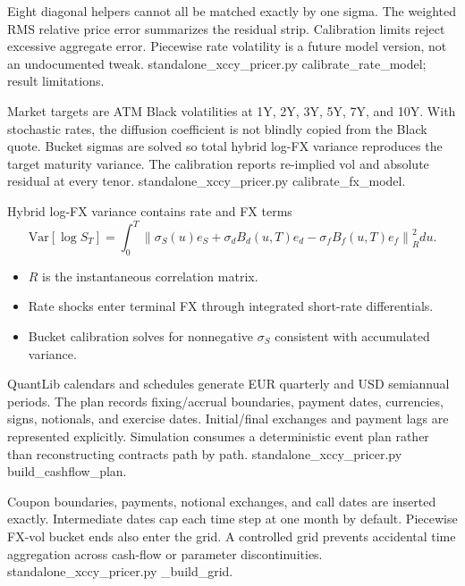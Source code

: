 {Eight diagonal helpers cannot all be matched exactly by one sigma.}
{The weighted RMS relative price error summarizes the residual strip.}
{Calibration limits reject excessive aggregate error.}
{Piecewise rate volatility is a future model version, not an undocumented tweak.}
{standalone\_xccy\_pricer.py calibrate\_rate\_model; result limitations.}

{Market targets are ATM Black volatilities at 1Y, 2Y, 3Y, 5Y, 7Y, and 10Y.}
{With stochastic rates, the diffusion coefficient is not blindly copied from the Black quote.}
{Bucket sigmas are solved so total hybrid log-FX variance reproduces the target maturity variance.}
{The calibration reports re-implied vol and absolute residual at every tenor.}
{standalone\_xccy\_pricer.py calibrate\_fx\_model.}

\begin{frame}{Hybrid log-FX variance contains rate and FX terms}
  \[
  \mathrm{Var}[\log S_T]
  =\int_0^T \left\|\sigma_S(u)e_S
  +\sigma_d B_d(u,T)e_d
  -\sigma_f B_f(u,T)e_f\right\|_R^2du.
  \]
  \begin{itemize}\setlength\itemsep{0.8em}
    \item $R$ is the instantaneous correlation matrix.
    \item Rate shocks enter terminal FX through integrated short-rate differentials.
    \item Bucket calibration solves for nonnegative $\sigma_S$ consistent with accumulated variance.
  \end{itemize}
\end{frame}

{QuantLib calendars and schedules generate EUR quarterly and USD semiannual periods.}
{The plan records fixing/accrual boundaries, payment dates, currencies, signs, notionals, and exercise dates.}
{Initial/final exchanges and payment lags are represented explicitly.}
{Simulation consumes a deterministic event plan rather than reconstructing contracts path by path.}
{standalone\_xccy\_pricer.py build\_cashflow\_plan.}

{Coupon boundaries, payments, notional exchanges, and call dates are inserted exactly.}
{Intermediate dates cap each time step at one month by default.}
{Piecewise FX-vol bucket ends also enter the grid.}
{A controlled grid prevents accidental time aggregation across cash-flow or parameter discontinuities.}
{standalone\_xccy\_pricer.py \_build\_grid.}

